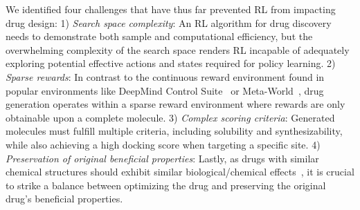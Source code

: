 We identified four challenges that have thus far prevented RL from impacting drug design:
1) \textit{Search space complexity}\/: 
An RL algorithm for drug discovery needs to demonstrate both sample and computational efficiency, but the overwhelming complexity of the search space \citep{polya2012combinatorial} renders RL incapable of adequately exploring potential effective actions and states required for policy learning.
2) \textit{Sparse rewards}\/:
In contrast to the continuous reward environment found in popular environments like DeepMind Control Suite~\citep{tassa2018deepmind} or Meta-World~\citep{yu2020meta}, drug generation operates within a sparse reward environment where rewards are only obtainable upon {a complete molecule}.
3) \textit{Complex scoring criteria}\/: 
Generated molecules must fulfill multiple criteria, including solubility and synthesizability, 
while also achieving a high docking score when targeting a specific site.
4) {
\textit{Preservation of original beneficial properties}\/:
Lastly, as drugs with similar chemical structures should exhibit similar biological/chemical effects~\citep{bender2004molecular}, it is crucial to strike a balance between optimizing the drug and preserving the original drug's beneficial properties.
} 


